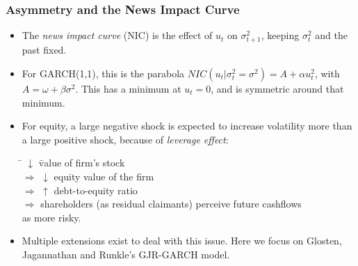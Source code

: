 \begin{frame}%

\frametitle{Asymmetry and the News Impact Curve}

\begin{itemize}
\item The \emph{\color{red}news impact curve} (NIC) is the effect of $u_{t}$
on $\sigma _{t+1}^{2}$, keeping $\sigma _{t}^{2}$ and the past fixed.

\item For GARCH(1,1), this is the parabola $NIC(u_{t}|\sigma _{t}^{2}=\sigma
^{2})=A+\alpha u_{t}^{2}$, with $A=\omega +\beta \sigma ^{2}$. This has a
minimum at $u_{t}=0$, and is symmetric around that minimum.

\item For equity, a large negative shock is expected to
increase volatility more than a large positive shock,
because of \emph{\color{red}leverage effect}:
\begin{tabbing}
\hspace{4ex} \= $\downarrow$ \=value of firm's stock \\
$\Rightarrow$ \> $\downarrow$ \> equity value of the firm \\
$\Rightarrow$ \> $\uparrow$ \> debt-to-equity ratio \\
$\Rightarrow$ \> shareholders (as residual claimants) perceive future cashflows\\
\> as more risky.
\end{tabbing}

\item Multiple extensions exist to deal with this issue. Here we focus on Glosten, Jagannathan and Runkle's GJR-GARCH model.
\end{itemize}

\end{frame}%

